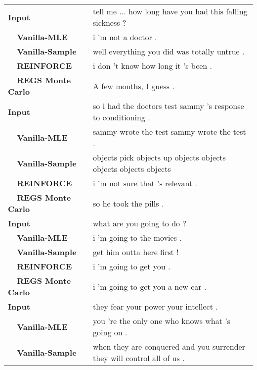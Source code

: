 \begin{table*}[t]
\centering
\footnotesize
\begin{tabular}{p{4cm}p{11cm}}\hline
{\bf Input}&tell me ... how long have you had this falling sickness ?\\
{\bf ~~Vanilla-MLE}&i 'm not a doctor .\\
{\bf ~~Vanilla-Sample}&well everything you did was totally untrue .\\
{\bf ~~REINFORCE}&i don 't know how long it 's been .\\
{\bf ~~REGS Monte Carlo}& A few months, I guess .\\\hline
{\bf Input}&so i had the doctors test sammy 's response to conditioning .\\
{\bf ~~Vanilla-MLE}&sammy wrote the test sammy wrote the test .\\
{\bf ~~Vanilla-Sample}&objects pick objects up objects objects objects objects objects \\
{\bf ~~REINFORCE}&i 'm not sure that 's relevant .\\
{\bf ~~REGS Monte Carlo}&so he took the pills .\\\hline
{\bf Input}&what are you going to do ?\\
{\bf ~~Vanilla-MLE}&i 'm going to the movies .\\
{\bf ~~Vanilla-Sample}&get him outta here first !\\
{\bf ~~REINFORCE}&i 'm going to get you .\\
{\bf ~~REGS Monte Carlo}&i 'm going to get you a new car .\\\hline
{\bf Input}&they fear your power your intellect .\\
{\bf ~~Vanilla-MLE}&you 're the only one who knows what 's going on .\\
{\bf ~~Vanilla-Sample}&when they are conquered and you surrender they will control all of us .\\

\end{tabular}
\end{table*}
